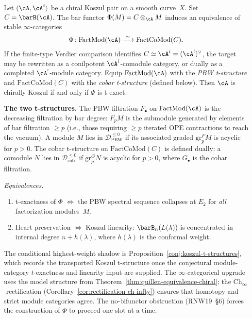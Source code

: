\begin{conjecture}
\label{conj:module-category-t-exactness}
Let $(\cA,\cA^i)$ be a chiral Koszul pair on a smooth curve~$X$.
Set $C=\barB(\cA)$.  The bar functor
$\Phi(M) = C \otimes_{\cA} M$ induces
an equivalence of stable $\infty$-categories
\[
 \Phi \colon \mathrm{FactMod}(\cA)
 \xrightarrow{\;\sim\;}
 \mathrm{FactCoMod}(C).
\]
If the finite-type Verdier comparison identifies
$C\simeq\cA^i=(\cA^!)^\vee$, the target may be rewritten as a
conilpotent $\cA^i$-comodule category, or dually as a completed
$\cA^!$-module category. Equip $\mathrm{FactMod}(\cA)$ with the
\emph{PBW t-structure}
and $\mathrm{FactCoMod}(C)$ with the \emph{cobar t-structure}
\textup{(}defined below\textup{)}. Then $\cA$ is chirally Koszul
if and only if $\Phi$ is t-exact.
\end{conjecture}

\textbf{The two t-structures.}
The PBW filtration $F_\bullet$ on $\mathrm{FactMod}(\cA)$ is the
decreasing filtration by bar degree: $F_p M$ is the submodule
generated by elements of bar filtration $\geq p$ (i.e., those
requiring $\geq p$ iterated OPE contractions to reach the vacuum).
A module $M$ lies in $\mathcal{D}_{\mathrm{PBW}}^{\leq 0}$ if
its associated graded $\mathrm{gr}^F_p M$ is acyclic for $p > 0$.
The cobar t-structure on $\mathrm{FactCoMod}(C)$ is defined
dually: a comodule $N$ lies in $\mathcal{D}_{\mathrm{cob}}^{\leq 0}$
if $\mathrm{gr}^G_p N$ is acyclic for $p > 0$, where $G_\bullet$
is the cobar filtration.

\smallskip
\noindent\emph{Equivalences.}
\begin{enumerate}[leftmargin=2em]
\item t-exactness of $\Phi$ $\iff$ the PBW spectral sequence
 collapses at $E_2$ for \emph{all} factorization modules~$M$.
\item Heart preservation $\iff$ Koszul linearity:
 $\barB_n(L(\lambda))$ is concentrated in internal degree
 $n + h(\lambda)$, where $h(\lambda)$ is the conformal weight.
\end{enumerate}

\noindent
The conditional highest-weight shadow is
Proposition~\ref{conj:koszul-t-structures}, which records the
transported Koszul t-structure once the conjectural module-category
$t$-exactness and linearity input are supplied. The $\infty$-categorical
upgrade uses the model structure from
Theorem~\ref{thm:quillen-equivalence-chiral}; the
Ch$_\infty$-rectification
(Corollary~\ref{cor:rectification-ch-infty}) ensures that
homotopy and strict module categories agree.
The no-bifunctor obstruction (RNW19~\S6) forces the construction
of $\Phi$ to proceed one slot at a time.

